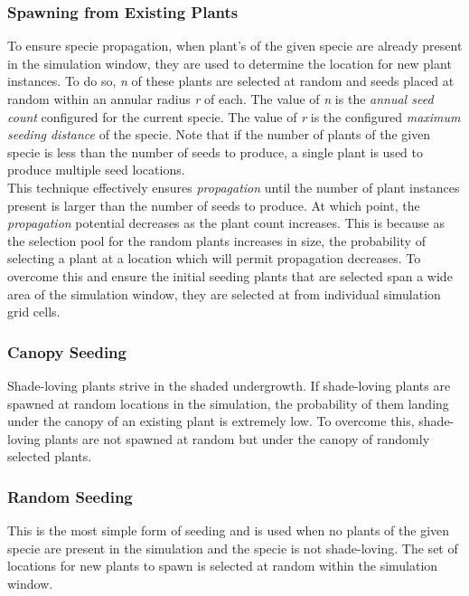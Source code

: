 \subsubsection{Spawning from Existing Plants}

To ensure specie propagation, when plant's of the given specie are already present in the simulation window, they are used to determine the location for new plant instances. To do so, \textit{n} of these plants are selected at random and seeds placed at random within an annular radius \textit{r} of each. The value of \textit{n} is the \textit{annual seed count} configured for the current specie. The value of \textit{r} is the configured \textit{maximum seeding distance} of the specie. Note that if the number of plants of the given specie is less than the number of seeds to produce, a single plant is used to produce multiple seed locations. \\

This technique effectively ensures \textit{propagation} until the number of plant instances present is larger than the number of seeds to produce. At which point, the \textit{propagation} potential decreases as the plant count increases. This is because as the selection pool for the random plants increases in size, the probability of selecting a plant at a location which will permit propagation decreases. To overcome this and ensure the initial seeding plants that are selected span a wide area of the simulation window, they are selected at from individual simulation grid cells.\\

\subsubsection{Canopy Seeding}

Shade-loving plants strive in the shaded undergrowth. If shade-loving plants are spawned at random locations in the simulation, the probability of them landing under the canopy of an existing plant is extremely low. To overcome this, shade-loving plants are not spawned at random but under the canopy of randomly selected plants.

\subsubsection{Random Seeding}

This is the most simple form of seeding and is used when no plants of the given specie are present in the simulation and the specie is not shade-loving. The set of locations for new plants to spawn is selected at random within the simulation window.